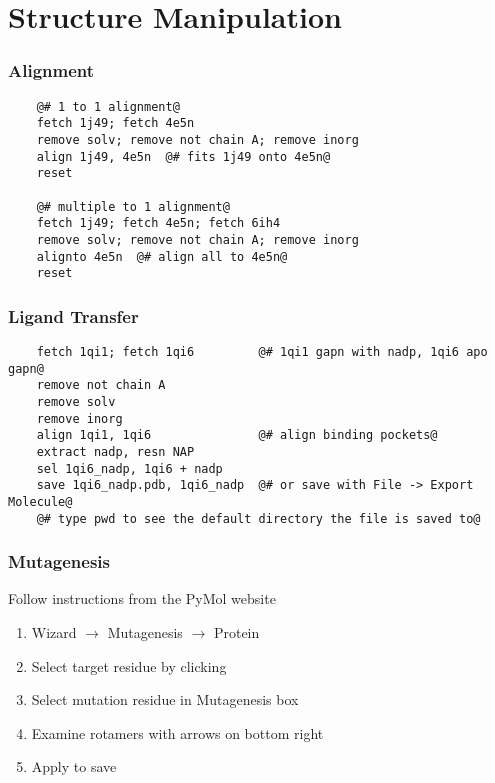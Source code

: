 \documentclass[aspectratio=169]{beamer}
\begin{document}
\section{Structure Manipulation}

\begin{frame}[fragile]
\frametitle{Alignment}
    \begin{lstlisting}
    @# 1 to 1 alignment@
    fetch 1j49; fetch 4e5n
    remove solv; remove not chain A; remove inorg
    align 1j49, 4e5n  @# fits 1j49 onto 4e5n@
    reset

    @# multiple to 1 alignment@
    fetch 1j49; fetch 4e5n; fetch 6ih4
    remove solv; remove not chain A; remove inorg
    alignto 4e5n  @# align all to 4e5n@
    reset
    \end{lstlisting}

\end{frame}

\begin{frame}[fragile]
\frametitle{Ligand Transfer}
    \begin{lstlisting}
    fetch 1qi1; fetch 1qi6         @# 1qi1 gapn with nadp, 1qi6 apo gapn@
    remove not chain A
    remove solv
    remove inorg
    align 1qi1, 1qi6               @# align binding pockets@
    extract nadp, resn NAP
    sel 1qi6_nadp, 1qi6 + nadp
    save 1qi6_nadp.pdb, 1qi6_nadp  @# or save with File -> Export Molecule@
    @# type pwd to see the default directory the file is saved to@
    \end{lstlisting}

\end{frame}

\begin{frame}[fragile]
\frametitle{Mutagenesis}

Follow instructions from the PyMol website
\href{https://pymolwiki.org/index.php/Mutagenesis}{\color{blue}{https://pymolwiki.org/index.php/Mutagenesis}}

\vspace*{0.5cm}
\begin{enumerate}
    \item{Wizard $\rightarrow$ Mutagenesis $\rightarrow$ Protein}
    \item{Select target residue by clicking}
    \item{Select mutation residue in Mutagenesis box}
    \item{Examine rotamers with arrows on bottom right}
    \item{Apply to save}
\end{enumerate}

\end{frame}
\end{document}
